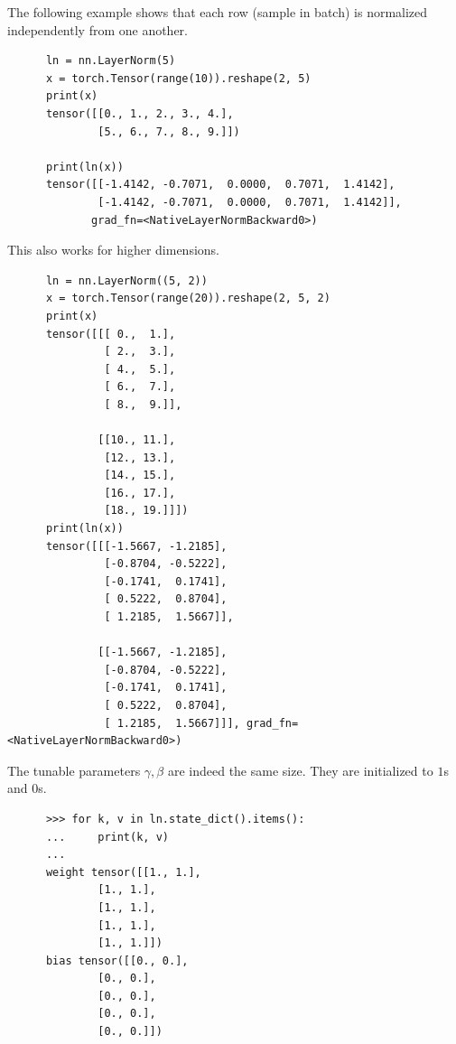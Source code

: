   \begin{example}
    The following example shows that each row (sample in batch) is normalized independently from one another. 
    \begin{lstlisting}
      ln = nn.LayerNorm(5)
      x = torch.Tensor(range(10)).reshape(2, 5)
      print(x)
      tensor([[0., 1., 2., 3., 4.],
              [5., 6., 7., 8., 9.]])

      print(ln(x))
      tensor([[-1.4142, -0.7071,  0.0000,  0.7071,  1.4142],
              [-1.4142, -0.7071,  0.0000,  0.7071,  1.4142]],
             grad_fn=<NativeLayerNormBackward0>)
    \end{lstlisting}
    This also works for higher dimensions. 
    \begin{lstlisting}
      ln = nn.LayerNorm((5, 2))
      x = torch.Tensor(range(20)).reshape(2, 5, 2)
      print(x)
      tensor([[[ 0.,  1.],
               [ 2.,  3.],
               [ 4.,  5.],
               [ 6.,  7.],
               [ 8.,  9.]],

              [[10., 11.],
               [12., 13.],
               [14., 15.],
               [16., 17.],
               [18., 19.]]])
      print(ln(x))
      tensor([[[-1.5667, -1.2185],
               [-0.8704, -0.5222],
               [-0.1741,  0.1741],
               [ 0.5222,  0.8704],
               [ 1.2185,  1.5667]],

              [[-1.5667, -1.2185],
               [-0.8704, -0.5222],
               [-0.1741,  0.1741],
               [ 0.5222,  0.8704],
               [ 1.2185,  1.5667]]], grad_fn=<NativeLayerNormBackward0>)
    \end{lstlisting}
    The tunable parameters $\gamma, \beta$ are indeed the same size. They are initialized to $1$s and $0$s. 
      \begin{lstlisting}
      >>> for k, v in ln.state_dict().items(): 
      ...     print(k, v)
      ... 
      weight tensor([[1., 1.],
              [1., 1.],
              [1., 1.],
              [1., 1.],
              [1., 1.]])
      bias tensor([[0., 0.],
              [0., 0.],
              [0., 0.],
              [0., 0.],
              [0., 0.]])
    \end{lstlisting}
  \end{example}

